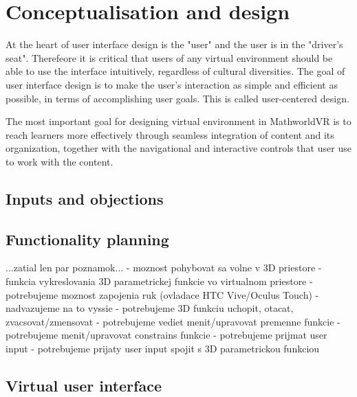 \section{Conceptualisation and design}
At the heart of user interface design is the "user" and the user is in the "driver's seat". Therefeore it is critical that users of any virtual environment should be able to use the interface intuitively, regardless of cultural diversities. The goal of user interface design is to make the user's interaction as simple and efficient as possible, in terms of accomplishing user goals. This is called user-centered design.\cite{badrul}

The most important goal for designing virtual environment in MathworldVR is to reach learners more effectively through seamless integration of content and its organization, together with the navigational and interactive controls that user use to work with the content.

\subsection{Inputs and objections}

\subsection{Functionality planning}
...zatial len par poznamok...
- moznost pohybovat sa volne v 3D priestore
- funkcia vykreslovania 3D parametrickej funkcie vo virtualnom priestore
- potrebujeme moznost zapojenia ruk (ovladace HTC Vive/Oculus Touch)
- nadvazujeme na to vyssie - potrebujeme 3D funkciu uchopit, otacat, zvacsovat/zmensovat
- potrebujeme vediet menit/upravovat premenne funkcie
- potrebujeme menit/upravovat constrains funkcie
- potrebujeme prijmat user input
- potrebujeme prijaty user input spojit s 3D parametrickou funkciou

\subsection{Virtual user interface}


